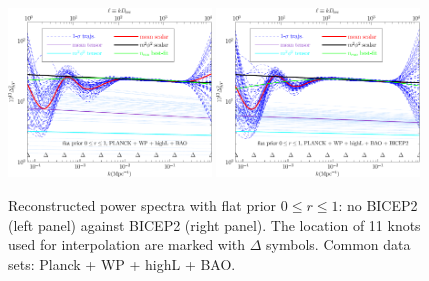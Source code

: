 \documentclass[a4paper,11pt]{article}
\def \halffigwidth{0.48\textwidth}
\begin{document}
\begin{figure}
  \includegraphics[width = \halffigwidth]{nobicep_spline0_p11_power_trajs.pdf}%
  \includegraphics[width = \halffigwidth]{spline0_p11_power_trajs.pdf}
\caption{Reconstructed power spectra with flat prior $0\le r\le 1$: no BICEP2 (left panel) against BICEP2 (right panel). The location of 11 knots used for interpolation are marked with $\Delta$ symbols. Common data sets: Planck + WP + highL + BAO. \label{fig:traj_bnb}}
\end{figure}
\end{document}
